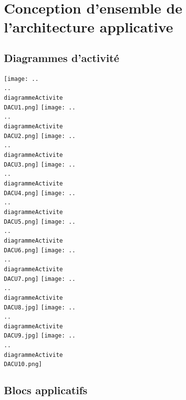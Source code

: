 
\section{Conception d'ensemble de l'architecture applicative}

\subsection{Diagrammes d'activité}

\begin {center}
\texttt{[image: ..\\..\\diagrammeActivite\\DACU1.png]}
\texttt{[image: ..\\..\\diagrammeActivite\\DACU2.png]}
\texttt{[image: ..\\..\\diagrammeActivite\\DACU3.png]}
\texttt{[image: ..\\..\\diagrammeActivite\\DACU4.png]}
\texttt{[image: ..\\..\\diagrammeActivite\\DACU5.png]}
\texttt{[image: ..\\..\\diagrammeActivite\\DACU6.png]}
\texttt{[image: ..\\..\\diagrammeActivite\\DACU7.png]}
\texttt{[image: ..\\..\\diagrammeActivite\\DACU8.jpg]}
\texttt{[image: ..\\..\\diagrammeActivite\\DACU9.jpg]}
\texttt{[image: ..\\..\\diagrammeActivite\\DACU10.png]}
\end {center}

\subsection{Blocs applicatifs}

